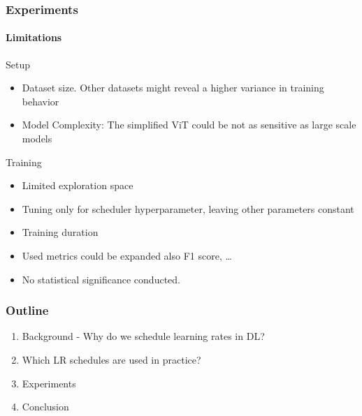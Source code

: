 \documentclass[10pt,aspectratio=169]{beamer}
\begin{document}
    \begin{frame}
        \frametitle{Experiments}
        \framesubtitle{Limitations}
        Setup
        \begin{itemize}
            \item Dataset size. Other datasets might reveal a higher variance in training behavior
            \item Model Complexity: The simplified ViT could be not as sensitive as large scale models
        \end{itemize}
        \vspace{0.5cm}
        Training
        \begin{itemize}
            \item Limited exploration space
            \item Tuning only for scheduler hyperparameter, leaving other parameters constant
            \item Training duration
            \item Used metrics could be expanded also F1 score, … 
            \item No statistical significance conducted. 
        \end{itemize}
    \end{frame}


    \begin{darkframe}
        \frametitle{Outline}
        \begin{enumerate}
            \item Background - Why do we schedule learning rates in DL?
            \item Which LR schedules are used in practice?
            \item Experiments
            \item Conclusion
        \end{enumerate}
    \end{darkframe}
\end{document}
